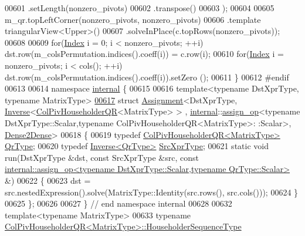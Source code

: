 \begin{DoxyCode}
00601                     .setLength(nonzero\_pivots)
00602                     .transpose()
00603     );
00604 
00605   m\_qr.topLeftCorner(nonzero\_pivots, nonzero\_pivots)
00606       .template triangularView<Upper>()
00607       .solveInPlace(c.topRows(nonzero\_pivots));
00608 
00609   \textcolor{keywordflow}{for}(\hyperlink{namespace_eigen_a62e77e0933482dafde8fe197d9a2cfde}{Index} i = 0; i < nonzero\_pivots; ++i) dst.row(m\_colsPermutation.indices().coeff(i)) = c.row(i);
00610   \textcolor{keywordflow}{for}(\hyperlink{namespace_eigen_a62e77e0933482dafde8fe197d9a2cfde}{Index} i = nonzero\_pivots; i < cols(); ++i) dst.row(m\_colsPermutation.indices().coeff(i)).setZero
      ();
00611 \}
00612 \textcolor{preprocessor}{#endif}
00613 
00614 \textcolor{keyword}{namespace }\hyperlink{namespaceinternal}{internal} \{
00615 
00616 \textcolor{keyword}{template}<\textcolor{keyword}{typename} DstXprType, \textcolor{keyword}{typename} MatrixType>
\hyperlink{struct_eigen_1_1internal_1_1_assignment_3_01_dst_xpr_type_00_01_inverse_3_01_col_piv_householdera738c212c6cb5ba27ad8c50c6864d6b5}{00617} \textcolor{keyword}{struct }\hyperlink{struct_eigen_1_1internal_1_1_assignment}{Assignment}<DstXprType, \hyperlink{class_eigen_1_1_inverse}{Inverse}<\hyperlink{group___q_r___module_class_eigen_1_1_col_piv_householder_q_r}{ColPivHouseholderQR}<MatrixType> >
      , \hyperlink{namespaceinternal}{internal}::\hyperlink{struct_eigen_1_1internal_1_1assign__op}{assign\_op}<typename DstXprType::Scalar,typename ColPivHouseholderQR<MatrixType>:
      :Scalar>, \hyperlink{struct_eigen_1_1internal_1_1_dense2_dense}{Dense2Dense}>
00618 \{
00619   \textcolor{keyword}{typedef} \hyperlink{group___q_r___module}{ColPivHouseholderQR<MatrixType>} \hyperlink{group___q_r___module}{QrType};
00620   \textcolor{keyword}{typedef} \hyperlink{class_eigen_1_1_inverse}{Inverse<QrType>} \hyperlink{class_eigen_1_1_inverse}{SrcXprType};
00621   \textcolor{keyword}{static} \textcolor{keywordtype}{void} run(DstXprType &dst, \textcolor{keyword}{const} SrcXprType &src, \textcolor{keyword}{const} 
      \hyperlink{struct_eigen_1_1internal_1_1assign__op}{internal::assign\_op<typename DstXprType::Scalar,typename QrType::Scalar>}
       &)
00622   \{
00623     dst = src.nestedExpression().solve(MatrixType::Identity(src.rows(), src.cols()));
00624   \}
00625 \};
00626 
00627 \} \textcolor{comment}{// end namespace internal}
00628 
00632 \textcolor{keyword}{template}<\textcolor{keyword}{typename} MatrixType>
00633 \textcolor{keyword}{typename} \hyperlink{group___q_r___module_class_eigen_1_1_col_piv_householder_q_r}{ColPivHouseholderQR<MatrixType>::HouseholderSequenceType}

\end{DoxyCode}
